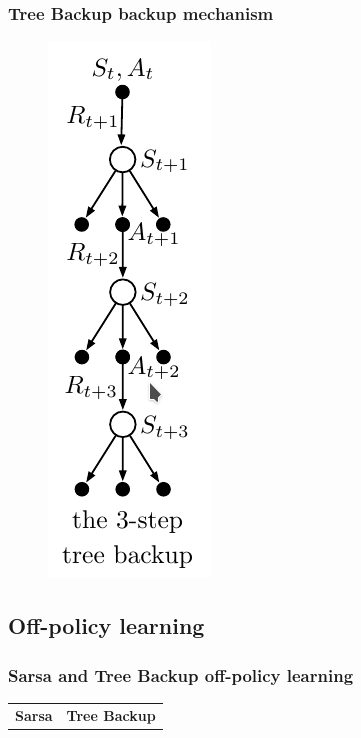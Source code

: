 \documentclass{beamer}
\begin{document}
\begin{frame}
  \frametitle{Tree Backup backup mechanism}
  \begin{figure}
    \centering
    \includegraphics[height=0.7 \textheight]{tree-backup}
  \end{figure}
\end{frame}

\subsection{Off-policy learning}

\begin{frame}
  \frametitle{Sarsa and Tree Backup off-policy learning}
    \begin{center}
    \begin{tabular}{ c | c }
      \textbf{Sarsa} & \textbf{Tree Backup} \\
    \end{tabular}
    \end{center}
\end{frame}
\end{document}
